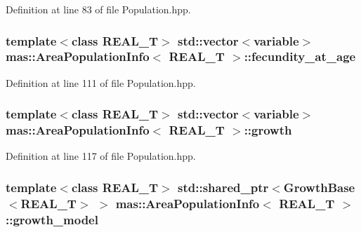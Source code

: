 Definition at line 83 of file Population.\-hpp.

\hypertarget{structmas_1_1_area_population_info_afcb882cbdf32fc615f9f23af09a51af3}{
\subsubsection[{fecundity\-\_\-at\-\_\-age}]{\setlength{\rightskip}{0pt plus 5cm}template$<$class R\-E\-A\-L\-\_\-\-T$>$ std\-::vector$<${\bf variable}$>$ {\bf mas\-::\-Area\-Population\-Info}$<$ R\-E\-A\-L\-\_\-\-T $>$\-::fecundity\-\_\-at\-\_\-age}}\label{structmas_1_1_area_population_info_afcb882cbdf32fc615f9f23af09a51af3}


Definition at line 111 of file Population.\-hpp.

\hypertarget{structmas_1_1_area_population_info_acfb334a8301d5f2ecbf71d60c81f25c8}{
\subsubsection[{growth}]{\setlength{\rightskip}{0pt plus 5cm}template$<$class R\-E\-A\-L\-\_\-\-T$>$ std\-::vector$<${\bf variable}$>$ {\bf mas\-::\-Area\-Population\-Info}$<$ R\-E\-A\-L\-\_\-\-T $>$\-::growth}}\label{structmas_1_1_area_population_info_acfb334a8301d5f2ecbf71d60c81f25c8}


Definition at line 117 of file Population.\-hpp.

\hypertarget{structmas_1_1_area_population_info_a1b4170de0de0fb71776f3b4beb6e19a8}{
\subsubsection[{growth\-\_\-model}]{\setlength{\rightskip}{0pt plus 5cm}template$<$class R\-E\-A\-L\-\_\-\-T$>$ std\-::shared\-\_\-ptr$<${\bf Growth\-Base}$<$R\-E\-A\-L\-\_\-\-T$>$ $>$ {\bf mas\-::\-Area\-Population\-Info}$<$ R\-E\-A\-L\-\_\-\-T $>$\-::growth\-\_\-model}}\label{structmas_1_1_area_population_info_a1b4170de0de0fb71776f3b4beb6e19a8}


